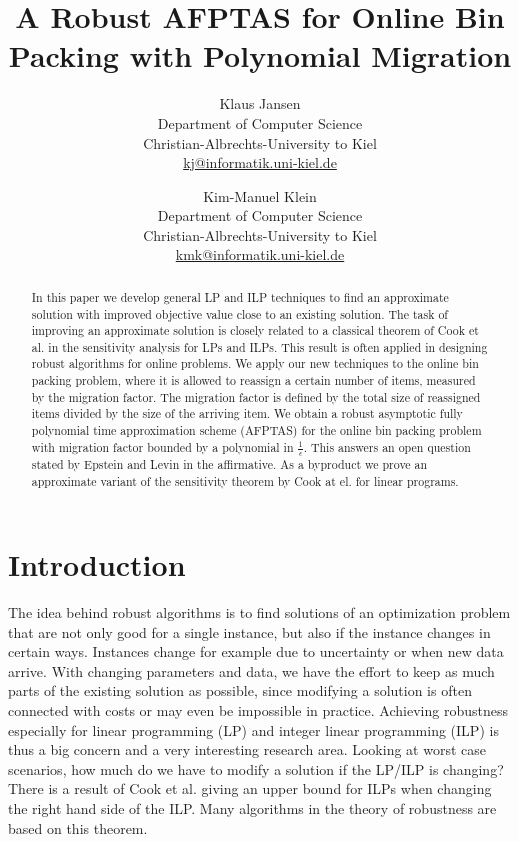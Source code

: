 \documentclass[a4paper,11pt]{article}
\title{A Robust AFPTAS for Online Bin Packing with Polynomial Migration}
\author{Klaus Jansen\\
Department of Computer Science\\
Christian-Albrechts-University to Kiel\\\url{ kj@informatik.uni-kiel.de}
 \and 
Kim-Manuel Klein\\
Department of Computer Science\\
Christian-Albrechts-University to Kiel\\
\url{ kmk@informatik.uni-kiel.de}}
\date{}
\begin{document}
\maketitle

\begin{abstract}
In this paper we develop general LP and ILP techniques to find an approximate solution with improved objective
value close to an existing solution.
The task of improving an approximate solution is closely related to a classical theorem of 
Cook et al. \cite{cook1986sensitivity} in the
sensitivity analysis for LPs and ILPs. This result is often applied in designing robust algorithms for online
problems.
We apply our new techniques to the online bin packing problem, where it is allowed to reassign a certain
number of items, measured by the migration factor. The migration factor is defined by
the total size of reassigned items divided by the size of the arriving item.
We obtain a robust asymptotic fully polynomial time approximation scheme (AFPTAS) for the online bin packing
problem with migration 
factor bounded by a polynomial in $\frac{1}{\epsilon}$.
This answers an open question stated by Epstein and Levin \cite{epstein2006robust} in the affirmative.
As a byproduct we prove an approximate variant of the sensitivity
theorem by Cook at el. \cite{cook1986sensitivity} for linear programs.
\end{abstract}


\section{Introduction}
The idea behind robust algorithms is to find solutions of an optimization problem 
that are not only good for a single instance, but also if the instance changes in 
certain ways. Instances change for example due to uncertainty or when new data
arrive. With changing parameters and data, we have the effort to keep as much 
parts of the existing solution as possible, since modifying a solution is often
connected with costs or may even be impossible in practice.
Achieving robustness especially for linear programming (LP) and integer linear programming (ILP)
is thus a big concern and a very interesting research area. Looking at worst case scenarios, how
much do we have to modify a solution if the LP/ILP is changing? There is a result of Cook et al. \cite{cook1986sensitivity}
giving an upper bound for ILPs when changing the right hand side of the ILP.
Many algorithms in the theory of robustness are based on this theorem.
\end{document}
